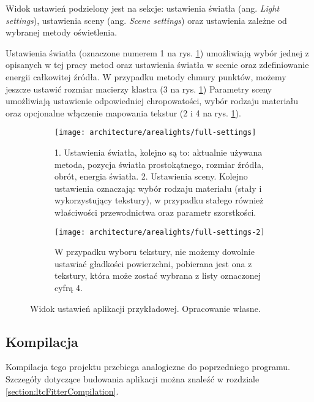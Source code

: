 \documentclass[../main.tex]{subfiles}
\begin{document}
Widok ustawień podzielony jest na sekcje: ustawienia światła (ang. \textit{Light settings}), ustawienia sceny (ang. \textit{Scene settings}) oraz ustawienia zależne od wybranej metody oświetlenia.

Ustawienia światła (oznaczone numerem 1 na rys. \ref{fig:app_arealights_settings}) umożliwiają wybór jednej z opisanych w tej pracy metod oraz ustawienia światła w scenie oraz zdefiniowanie energii całkowitej źródła. W przypadku metody chmury punktów, możemy jeszcze ustawić rozmiar macierzy klastra (3 na rys. \ref{fig:app_arealights_settings}) Parametry sceny umożliwiają ustawienie odpowiedniej chropowatości, wybór rodzaju materiału oraz opcjonalne włączenie mapowania tekstur (2 i 4 na rys. \ref{fig:app_arealights_settings}).

\begin{figure}[h]
    \centering
    \begin{subfigure}[t]{0.40\linewidth}
        \texttt{[image: architecture/arealights/full-settings]}
        \caption{1. Ustawienia światła, kolejno są to: aktualnie używana metoda, pozycja światła prostokątnego, rozmiar źródła, obrót, energia światła. 2. Ustawienia sceny. Kolejno ustawienia oznaczają: wybór rodzaju materiału (stały i wykorzystujący tekstury), w przypadku stałego również właściwości przewodnictwa oraz parametr szorstkości.}
    \end{subfigure}
    \hspace{0.05\textwidth}
    \begin{subfigure}[t]{0.40\linewidth}
        \texttt{[image: architecture/arealights/full-settings-2]}
        \caption{W przypadku wyboru tekstury, nie możemy dowolnie ustawiać gładkości powierzchni, pobierana jest ona z tekstury, która może zostać wybrana z listy oznaczonej cyfrą 4.}
    \end{subfigure}

    \caption{Widok ustawień aplikacji przykładowej. Opracowanie własne.}
    \label{fig:app_arealights_settings}
\end{figure}

\subsection{Kompilacja}

Kompilacja tego projektu przebiega analogiczne do poprzedniego programu. Szczegóły dotyczące budowania aplikacji można znaleźć w rozdziale \ref{section:ltcFitterCompilation}.
\end{document}
